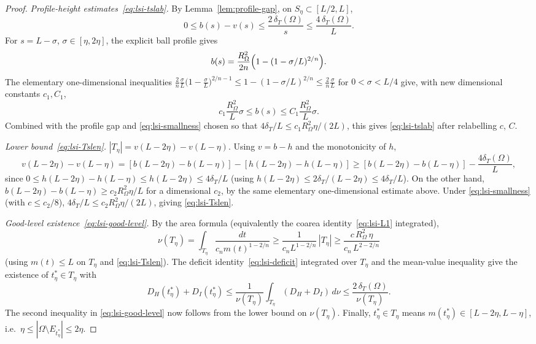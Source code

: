 \begin{proof}
{\it Profile-height estimates~\eqref{eq:lsi-tslab}.}
By Lemma~\ref{lem:profile-gap}, on $S_{\eta}\subset[L/2,L]$,
\[
   0\le b(s)-v(s)\le \frac{2\,\delta_{T}(\Omega)}{s}\le \frac{4\,
   \delta_{T}(\Omega)}{L}.
\]
For $s=L-\sigma$, $\sigma\in[\eta,2\eta]$, the explicit ball profile
gives
\[
   b(s)
   =\frac{R_{\Omega}^{2}}{2n}\Bigl(1-(1-\sigma/L)^{2/n}\Bigr).
\]
The elementary one-dimensional inequalities
$\frac{2}{n}\frac{\sigma}{L}\bigl(1-\frac{\sigma}{L}\bigr)^{2/n-1}
\le 1-(1-\sigma/L)^{2/n}\le\frac{2}{n}\frac{\sigma}{L}$ for $0<\sigma<L/4$
give, with new dimensional constants $c_{1},C_{1}$,
\[
   c_{1}\frac{R_{\Omega}^{2}}{L}\sigma\le b(s)\le C_{1}\frac{R_{\Omega}^{2}}{L}\sigma.
\]
Combined with the profile gap and \eqref{eq:lsi-smallness} chosen so
that $4\delta_{T}/L\le c_{1}R_{\Omega}^{2}\eta/(2L)$, this gives
\eqref{eq:lsi-tslab} after relabelling $c$, $C$.

{\it Lower bound~\eqref{eq:lsi-Tslen}.}
$|T_{\eta}|=v(L-2\eta)-v(L-\eta)$. Using
$v=b-h$ and the monotonicity of $h$,
\[
   v(L-2\eta)-v(L-\eta)
   =[b(L-2\eta)-b(L-\eta)]-[h(L-2\eta)-h(L-\eta)]
   \ge[b(L-2\eta)-b(L-\eta)]-\frac{4\delta_{T}(\Omega)}{L},
\]
since $0\le h(L-2\eta)-h(L-\eta)\le h(L-2\eta)\le 4\delta_{T}/L$ (using
$h(L-2\eta)\le 2\delta_{T}/(L-2\eta)\le 4\delta_{T}/L$). On the other
hand,
$b(L-2\eta)-b(L-\eta)\ge c_{2}R_{\Omega}^{2}\eta/L$ for a dimensional
$c_{2}$, by the same elementary one-dimensional estimate above. Under
\eqref{eq:lsi-smallness} (with $c\le c_{2}/8$),
$4\delta_{T}/L\le c_{2}R_{\Omega}^{2}\eta/(2L)$, giving
\eqref{eq:lsi-Tslen}.

{\it Good-level existence~\eqref{eq:lsi-good-level}.}
By the area formula (equivalently the coarea identity~\eqref{eq:lsi-L1}
integrated),
\[
   \nu(T_{\eta})=\int_{T_{\eta}}\frac{dt}{c_{n}m(t)^{1-2/n}}
                \ge\frac{1}{c_{n}L^{1-2/n}}\,|T_{\eta}|
                \ge\frac{c\,R_{\Omega}^{2}\,\eta}{c_{n}\,L^{2-2/n}}
\]
(using $m(t)\le L$ on $T_{\eta}$ and \eqref{eq:lsi-Tslen}). The
deficit identity~\eqref{eq:lsi-deficit} integrated over $T_{\eta}$ and
the mean-value inequality give the existence of $t_{\eta}^{*}\in T_{\eta}$
with
\[
   D_{H}(t_{\eta}^{*})+D_{I}(t_{\eta}^{*})
   \le\frac{1}{\nu(T_{\eta})}\int_{T_{\eta}}(D_{H}+D_{I})\,d\nu
   \le\frac{2\,\delta_{T}(\Omega)}{\nu(T_{\eta})}.
\]
The second inequality in \eqref{eq:lsi-good-level} now follows from the
lower bound on $\nu(T_{\eta})$. Finally, $t_{\eta}^{*}\in T_{\eta}$ means
$m(t_{\eta}^{*})\in[L-2\eta,L-\eta]$, i.e.\ $\eta\le|\Omega\setminus
E_{t_{\eta}^{*}}|\le 2\eta$.
\end{proof}


